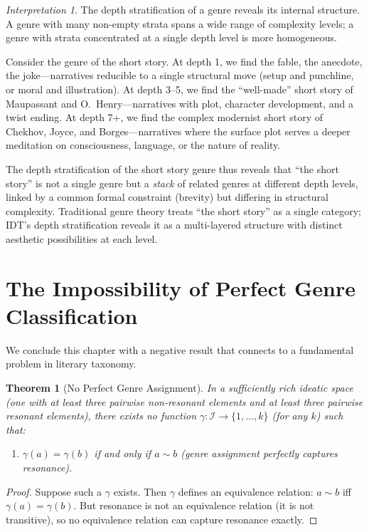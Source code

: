 \documentclass[11pt,openany]{book}
\theoremstyle{definition}
\theoremstyle{plain}
\newtheorem{theorem}[axiom]{Theorem}
\theoremstyle{remark}
\newtheorem{interpretation}[axiom]{Interpretation}
\newcommand{\IS}{\mathcal{I}}               %
\newcommand{\res}{\sim}                      %
\begin{document}
\begin{interpretation}
The depth stratification of a genre reveals its internal structure. A genre with many non-empty strata spans a wide range of complexity levels; a genre with strata concentrated at a single depth level is more homogeneous.

Consider the genre of the short story. At depth 1, we find the fable, the anecdote, the joke---narratives reducible to a single structural move (setup and punchline, or moral and illustration). At depth 3--5, we find the ``well-made'' short story of Maupassant and O.~Henry---narratives with plot, character development, and a twist ending. At depth 7+, we find the complex modernist short story of Chekhov, Joyce, and Borges---narratives where the surface plot serves a deeper meditation on consciousness, language, or the nature of reality.

The depth stratification of the short story genre thus reveals that ``the short story'' is not a single genre but a \emph{stack} of related genres at different depth levels, linked by a common formal constraint (brevity) but differing in structural complexity. Traditional genre theory treats ``the short story'' as a single category; IDT's depth stratification reveals it as a multi-layered structure with distinct aesthetic possibilities at each level.
\end{interpretation}

\section{The Impossibility of Perfect Genre Classification}

We conclude this chapter with a negative result that connects to a fundamental problem in literary taxonomy.

\begin{theorem}[No Perfect Genre Assignment]
In a sufficiently rich ideatic space (one with at least three pairwise non-resonant elements and at least three pairwise resonant elements), there exists no function $\gamma : \IS \to \{1, \ldots, k\}$ (for any $k$) such that:
\begin{enumerate}
\item $\gamma(a) = \gamma(b)$ if and only if $a \res b$ (genre assignment perfectly captures resonance).
\end{enumerate}
\end{theorem}

\begin{proof}
Suppose such a $\gamma$ exists. Then $\gamma$ defines an equivalence relation: $a \sim b$ iff $\gamma(a) = \gamma(b)$. But resonance is not an equivalence relation (it is not transitive), so no equivalence relation can capture resonance exactly.
\end{proof}
\end{document}
